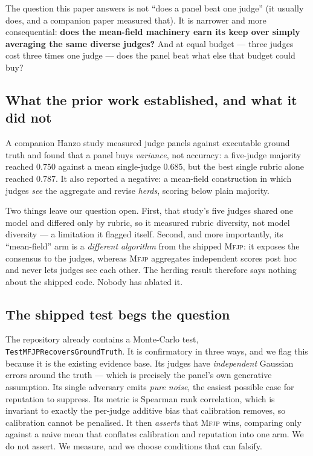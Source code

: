 \documentclass[11pt]{article}
\theoremstyle{definition}
\newcommand{\mfjp}{\textsc{Mfjp}}
\begin{document}
The question this paper answers is not ``does a panel beat one judge'' (it usually does, and a
companion paper measured that). It is narrower and more consequential:
\textbf{does the mean-field machinery earn its keep over simply averaging the same diverse
judges?} And at equal budget --- three judges cost three times one judge --- does the panel
beat what else that budget could buy?

\subsection{What the prior work established, and what it did not}

A companion Hanzo study measured judge panels against executable ground truth and found that a
panel buys \emph{variance}, not accuracy: a five-judge majority reached $0.750$ against a mean
single-judge $0.685$, but the best single rubric alone reached $0.787$. It also reported a
negative: a mean-field construction in which judges \emph{see} the aggregate and revise
\emph{herds}, scoring below plain majority.

Two things leave our question open. First, that study's five judges shared one model and
differed only by rubric, so it measured rubric diversity, not model diversity --- a limitation
it flagged itself. Second, and more importantly, its ``mean-field'' arm is a
\emph{different algorithm} from the shipped \mfjp{}: it exposes the consensus to the judges,
whereas \mfjp{} aggregates independent scores post hoc and never lets judges see each other.
The herding result therefore says nothing about the shipped code. Nobody has ablated it.

\subsection{The shipped test begs the question}

The repository already contains a Monte-Carlo test,
\texttt{TestMFJPRecoversGroundTruth}. It is confirmatory in three ways, and we flag this
because it is the existing evidence base. Its judges have \emph{independent} Gaussian errors
around the truth --- which is precisely the panel's own generative assumption. Its single
adversary emits \emph{pure noise}, the easiest possible case for reputation to suppress. Its
metric is Spearman rank correlation, which is invariant to exactly the per-judge additive bias
that calibration removes, so calibration cannot be penalised. It then \emph{asserts} that
\mfjp{} wins, comparing only against a naive mean that conflates calibration and reputation
into one arm. We do not assert. We measure, and we choose conditions that can falsify.
\end{document}
